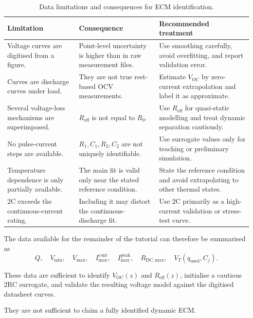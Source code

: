 \documentclass[a4paper,12pt]{article}
\begin{document}
\begin{table}[H]
\centering
\caption{Data limitations and consequences for ECM identification.}
\label{tab:data_limitations}
\begin{tabularx}{0.98\textwidth}{@{}L{0.30\textwidth}Y Y@{}}
\toprule
\textbf{Limitation} &
\textbf{Consequence} &
\textbf{Recommended treatment} \\
\midrule
Voltage curves are digitised from a figure. &
Point-level uncertainty is higher than in raw measurement files. &
Use smoothing carefully, avoid overfitting, and report validation error. \\
Curves are discharge curves under load. &
They are not true rest-based OCV measurements. &
Estimate \(V_{\mathrm{OC}}\) by zero-current extrapolation and label it as approximate. \\
Several voltage-loss mechanisms are superimposed. &
\(R_{\mathrm{eff}}\) is not equal to \(R_0\). &
Use \(R_{\mathrm{eff}}\) for quasi-static modelling and treat dynamic separation cautiously. \\
No pulse-current steps are available. &
\(R_1,C_1,R_2,C_2\) are not uniquely identifiable. &
Use surrogate values only for teaching or preliminary simulation. \\
Temperature dependence is only partially available. &
The main fit is valid only near the stated reference condition. &
State the reference condition and avoid extrapolating to other thermal states. \\
2C exceeds the continuous-current rating. &
Including it may distort the continuous-discharge fit. &
Use 2C primarily as a high-current validation or stress-test curve. \\
\bottomrule
\end{tabularx}
\end{table}

The data available for the remainder of the tutorial can therefore be summarised as
\begin{equation}
Q,
\quad
V_{\min},
\quad
V_{\max},
\quad
I_{\max}^{\mathrm{cont}},
\quad
I_{\max}^{\mathrm{peak}},
\quad
R_{\mathrm{DC,max}},
\quad
V_T(q_{\mathrm{used}},C_j).
\label{eq:data_available_summary}
\end{equation}

These data are sufficient to identify \(V_{\mathrm{OC}}(z)\) and \(R_{\mathrm{eff}}(z)\), initialise a cautious 2RC surrogate, and validate the resulting voltage model against the digitised datasheet curves.

They are not sufficient to claim a fully identified dynamic ECM.
\end{document}
